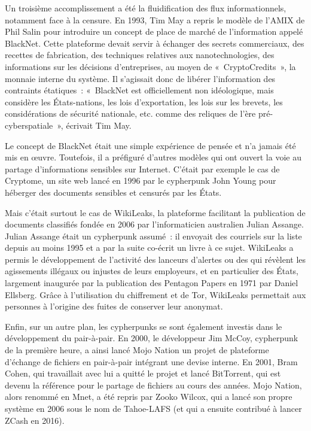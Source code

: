 Un troisième accomplissement a été la fluidification des flux informationnels, notamment face à la censure. En 1993, Tim May a repris le modèle de l'AMIX de Phil Salin pour introduire un concept de place de marché de l'information appelé BlackNet. Cette plateforme devait servir à échanger des secrets commerciaux, des recettes de fabrication, des techniques relatives aux nanotechnologies, des informations sur les décisions d'entreprises, au moyen de «~CryptoCredits~», la monnaie interne du système. Il s'agissait donc de libérer l'information des contraints étatiques~: «~BlackNet est officiellement non idéologique, mais considère les États-nations, les lois d'exportation, les lois sur les brevets, les considérations de sécurité nationale, etc. comme des reliques de l'ère pré-cyberspatiale~», écrivait Tim May.

Le concept de BlackNet était une simple expérience de pensée et n'a jamais été mis en œuvre. Toutefois, il a préfiguré d'autres modèles qui ont ouvert la voie au partage d'informations sensibles sur Internet. C'était par exemple le cas de Cryptome, un site web lancé en 1996 par le cypherpunk John Young pour héberger des documents sensibles et censurés par les États.

Mais c'était surtout le cas de WikiLeaks, la plateforme facilitant la publication de documents classifiés fondée en 2006 par l'informaticien australien Julian Assange. Julian Assange était un cypherpunk assumé~: il envoyait des courriels sur la liste depuis au moins 1995 et a par la suite co-écrit un livre à ce sujet. WikiLeaks a permis le développement de l'activité des lanceurs d'alertes ou des  qui révèlent les agissements illégaux ou injustes de leurs employeurs, et en particulier des États, largement inaugurée par la publication des Pentagon Papers en 1971 par Daniel Ellsberg. Grâce à l'utilisation du chiffrement et de Tor, WikiLeaks permettait aux personnes à l'origine des fuites de conserver leur anonymat.

Enfin, sur un autre plan, les cypherpunks se sont également investis dans le développement du pair-à-pair. En 2000, le développeur Jim McCoy, cypherpunk de la première heure, a ainsi lancé Mojo Nation un projet de plateforme d'échange de fichiers en pair-à-pair intégrant une devise interne. En 2001, Bram Cohen, qui travaillait avec lui a quitté le projet et lancé BitTorrent, qui est devenu la référence pour le partage de fichiers au cours des années. Mojo Nation, alors renommé en Mnet, a été repris par Zooko Wilcox, qui a lancé son propre système en 2006 sous le nom de Tahoe-LAFS (et qui a ensuite contribué à lancer ZCash en 2016). %

